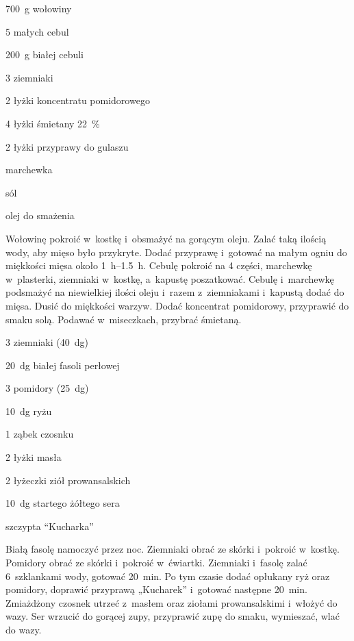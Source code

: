 \documentclass[main.tex]{subfiles}
\begin{document}

\begin{Ingred}
    \item \qty{700}{\gram} wołowiny
    \item \num{5} małych cebul
    \item \qty{200}{\gram} białej cebuli
    \item \num{3} ziemniaki
    \item \num{2} łyżki koncentratu pomidorowego
    \item \num{4} łyżki śmietany \qty{22}{\percent}
    \item \num{2} łyżki przyprawy do gulaszu
    \item marchewka
    \item sól
    \item olej do smażenia
\end{Ingred}

Wołowinę pokroić w~kostkę i~obsmażyć na gorącym oleju. Zalać taką ilością wody,
aby mięso było przykryte. Dodać przyprawę i~gotować na małym ogniu do miękkości
mięsa około \qtyrange{1}{1.5}{\hour}. Cebulę pokroić na \num{4} części,
marchewkę w~plasterki, ziemniaki w~kostkę, a~kapustę poszatkować. Cebulę
i~marchewkę podsmażyć na niewielkiej ilości oleju i~razem z~ziemniakami
i~kapustą dodać do mięsa. Dusić do miękkości warzyw. Dodać koncentrat
pomidorowy, przyprawić do smaku solą. Podawać w~miseczkach, przybrać śmietaną.


\begin{Ingred}
    \item \num{3} ziemniaki (\qty{40}{\deca\gram})
    \item \qty{20}{\deca\gram} białej fasoli perłowej
    \item \num{3} pomidory (\qty{25}{\deca\gram})
    \item \qty{10}{\deca\gram} ryżu
    \item \num{1} ząbek czosnku
    \item \num{2} łyżki masła
    \item \num{2} łyżeczki ziół prowansalskich
    \item \qty{10}{\deca\gram} startego żółtego sera
    \item szczypta \enquote{Kucharka}
\end{Ingred}

Białą fasolę namoczyć przez noc. Ziemniaki obrać ze skórki i~pokroić w~kostkę.
Pomidory obrać ze skórki i~pokroić w~ćwiartki. Ziemniaki i~fasolę zalać
6~szklankami wody, gotować \qty{20}{\minute}. Po tym czasie dodać opłukany ryż
oraz pomidory, doprawić przyprawą „Kucharek” i~gotować następne
\qty{20}{\minute}. Zmiażdżony czosnek utrzeć z~masłem oraz ziołami
prowansalskimi i~włożyć do wazy. Ser wrzucić do gorącej zupy, przyprawić zupę
do smaku, wymieszać, wlać do wazy.
\end{document}
